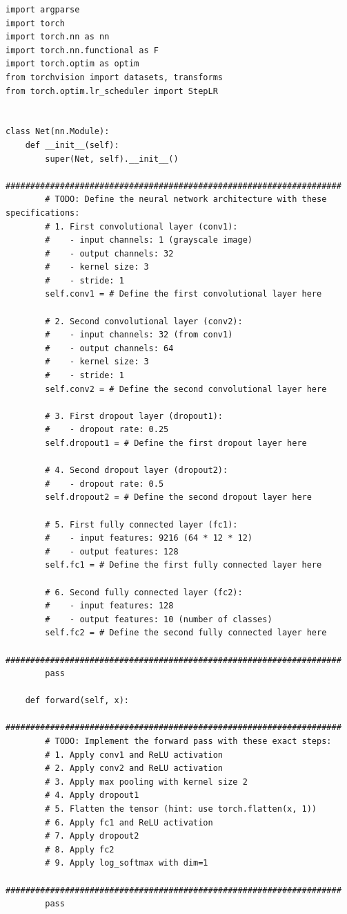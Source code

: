 \documentclass[letter]{article}
\theoremstyle{definition}
\begin{document}
\begin{verbatim}
import argparse
import torch
import torch.nn as nn
import torch.nn.functional as F
import torch.optim as optim
from torchvision import datasets, transforms
from torch.optim.lr_scheduler import StepLR


class Net(nn.Module):
    def __init__(self):
        super(Net, self).__init__()
        ####################################################################
        # TODO: Define the neural network architecture with these specifications:
        # 1. First convolutional layer (conv1):
        #    - input channels: 1 (grayscale image)
        #    - output channels: 32
        #    - kernel size: 3
        #    - stride: 1
        self.conv1 = # Define the first convolutional layer here

        # 2. Second convolutional layer (conv2):
        #    - input channels: 32 (from conv1)
        #    - output channels: 64
        #    - kernel size: 3
        #    - stride: 1
        self.conv2 = # Define the second convolutional layer here

        # 3. First dropout layer (dropout1):
        #    - dropout rate: 0.25
        self.dropout1 = # Define the first dropout layer here

        # 4. Second dropout layer (dropout2):
        #    - dropout rate: 0.5
        self.dropout2 = # Define the second dropout layer here

        # 5. First fully connected layer (fc1):
        #    - input features: 9216 (64 * 12 * 12)
        #    - output features: 128
        self.fc1 = # Define the first fully connected layer here

        # 6. Second fully connected layer (fc2):
        #    - input features: 128
        #    - output features: 10 (number of classes)
        self.fc2 = # Define the second fully connected layer here
        ####################################################################
        pass

    def forward(self, x):
        ####################################################################
        # TODO: Implement the forward pass with these exact steps:
        # 1. Apply conv1 and ReLU activation
        # 2. Apply conv2 and ReLU activation
        # 3. Apply max pooling with kernel size 2
        # 4. Apply dropout1
        # 5. Flatten the tensor (hint: use torch.flatten(x, 1))
        # 6. Apply fc1 and ReLU activation
        # 7. Apply dropout2
        # 8. Apply fc2
        # 9. Apply log_softmax with dim=1
        ####################################################################
        pass



\end{verbatim}
\end{document}

